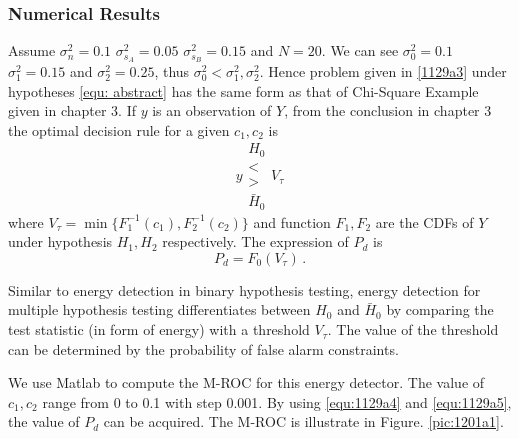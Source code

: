 \subsubsection{Numerical Results}
Assume $\sigma_n^2=0.1$ $\sigma_{s_A}^2=0.05$ $\sigma_{s_B}^2=0.15$ and $N=20$. We can see $\sigma_0^2=0.1$ $\sigma_1^2=0.15$ and $\sigma_2^2=0.25$, 
thus $\sigma_0^2 < \sigma_1^2, \sigma_2^2$. Hence  problem given in \eqref{1129a3} under hypotheses \eqref{equ: abstract} has the same form as that of Chi-Square Example given in chapter 3. 
If $y$ is an observation of $Y$, 
from the conclusion in chapter 3 the optimal  decision rule for a given $c_1, c_2$ is 
\begin{equation}
  y \substack{H_0 \\ < \\ > \\ \bar{H}_0} V_\tau
  \label{equ:1129a4}
\end{equation}
where $V_\tau = \min\{F_1^{-1}(c_1),  F_2^{-1}(c_2)\}$ and function $F_1,  F_2$ are the CDFs of $Y$ under hypothesis $H_1, H_2$ respectively. The expression of $P_d$ is 
\begin{equation}
  P_d = F_0(V_\tau)\,.
  \label{equ:1129a5}
\end{equation}

Similar to energy detection in binary hypothesis testing, energy detection for multiple hypothesis testing differentiates between $H_0$ and $\bar{H}_0$ by comparing the test statistic (in form of energy) with a threshold $V_\tau$. The value of the threshold can be determined by the probability of false alarm constraints.   

We use Matlab to compute the M-ROC for this energy detector. The value of $c_1, c_2$ range from 0 to 0.1 with step 0.001. By using \eqref{equ:1129a4} and \eqref{equ:1129a5}, the value of $P_d$ can be acquired. The M-ROC is illustrate in Figure. \ref{pic:1201a1}.  

